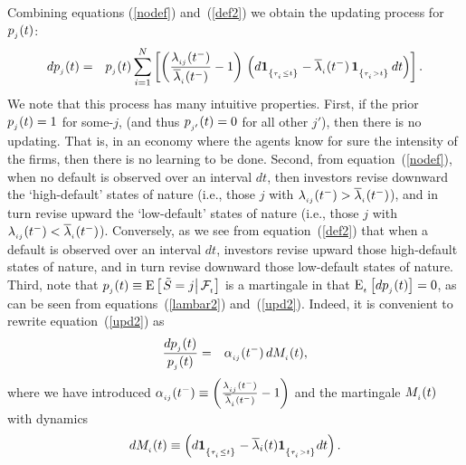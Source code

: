 \documentclass[titlepage,11pt]{article}
\def\bq{\begin{equation}}
\def\eq{\end{equation}}
\begin{document}
Combining equations (\ref{nodef}) and~(\ref{def2}) we obtain the
updating process for $p_{_{{j}}}(t)$:
\begin{eqnarray}\label{upd2}
dp_{_{{j}}}(t) &=& p_{_{{j}}}(t) \sum_{i=1}^N \left[ \left(
\frac{\lambda_{_{{ij}}}(t^{-})}{\overline{\lambda}_{_{{i}}}(t^{-})} - 1 \right)  \,
\left( d{\bf 1}_{_{{\left\{{\tau_{_{{i}}} \leq t}\right\}}}} -\overline{\lambda}_{_{{i}}}(t^{-})\,
{\bf 1}_{_{{\left\{{\tau_{_{{i}}} > t}\right\}}}} \, dt\right) \right].
\end{eqnarray}
We note that this process has many intuitive properties.  First, if
the prior $p_{_{{j}}}(t) = 1$ for some-$j$, (and thus $p_{_{{j'}}}(t) =
0$ for all other $j'$), then there is no updating. That is, in an
economy where the agents know for sure the intensity of the firms,
then there is no learning to be done. Second, from
equation~(\ref{nodef}), when no default is observed over an interval
$dt$, then investors revise downward the `high-default' states of
nature (i.e., those $j$ with $\lambda_{_{{ij}}}(t^{-}) >
\overline{\lambda}_{_{{i}}}(t^{-})$),  and in turn revise upward the
`low-default' states of nature (i.e., those $j$ with
$\lambda_{_{{ij}}}(t^{-}) < \overline{\lambda}_{_{{i}}}(t^{-})$).
Conversely, as we see from equation~(\ref{def2}) that when a default
is observed over an interval $dt$, investors revise upward those
high-default states of nature, and in turn revise downward those
low-default states of nature. Third, note that $p_{_{{j}}}(t) \equiv
\mbox{E}\left[ \left. \tilde{S} = j \right| {\cal F}_{_{{t}}} \right]$
is a martingale in that $\mbox{E}_{_{{t}}} \left[ dp_{_{{j}}}(t) \right]
= 0$, as can be seen from equations~(\ref{lambar2})
and~(\ref{upd2}). Indeed, it is convenient to rewrite
equation~(\ref{upd2}) as
\begin{eqnarray}\label{upd3}
\frac{dp_{_{{j}}}(t)}{p_{_{{j}}}(t)} &=& \alpha_{_{{ij}}}(t^{-}) \,
dM_{_{{i}}}(t),
\end{eqnarray}
where we have introduced $\alpha_{_{{ij}}}(t^{-}) \equiv \left(
\frac{\lambda_{_{{ij}}}(t^{-})}{\overline{\lambda}_{_{{i}}}(t^{-})} - 1 \right)$ and
the martingale $M_{_{{i}}}(t)$ with dynamics \bq dM\sub{i}(t) \equiv
\left( d\ind{\tau\sub{i}\leq t}-\lb_i(t)\ind{\tau\sub{i}>t} dt
\right). \eq
\end{document}
